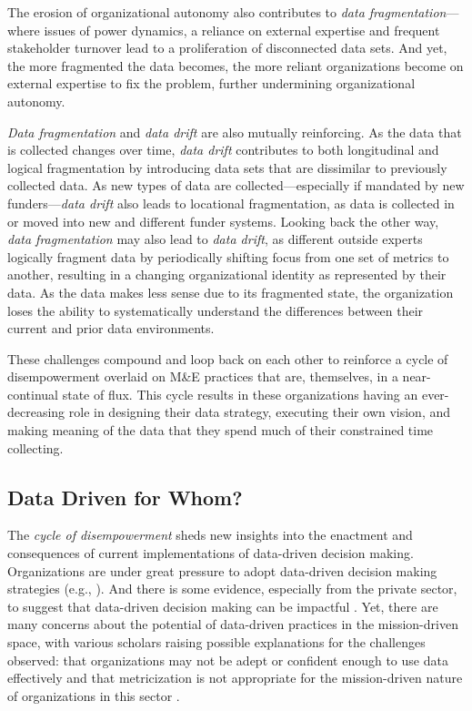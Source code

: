 The erosion of organizational autonomy also contributes to \textit{data fragmentation}---where issues of power dynamics, a reliance on external expertise and frequent stakeholder turnover lead to a proliferation of disconnected data sets. And yet, the more fragmented the data becomes, the more reliant organizations become on external expertise to fix the problem, further undermining organizational autonomy.

\textit{Data fragmentation} and \textit{data drift} are also mutually reinforcing. As the data that is collected changes over time, \textit{data drift} contributes to both longitudinal and logical fragmentation by introducing data sets that are dissimilar to previously collected data. As new types of data are collected---especially if mandated by new funders---\textit{data drift} also leads to locational fragmentation, as data is collected in or moved into new and different funder systems. Looking back the other way, \textit{data fragmentation} may also lead to \textit{data drift}, as different outside experts logically fragment data by periodically shifting focus from one set of metrics to another, resulting in a changing organizational identity as represented by their data. As the data makes less sense due to its fragmented state, the organization loses the ability to systematically understand the differences between their current and prior data environments.

These challenges compound and loop back on each other to reinforce a cycle of disempowerment overlaid on M\&E practices that are, themselves, in a near-continual state of flux. This cycle results in these organizations having an ever- decreasing role in designing their data strategy, executing their own vision, and making meaning of the data that they spend much of their constrained time collecting.

\subsection{Data Driven for Whom?}

The \textit{cycle of disempowerment} sheds new insights into the enactment and consequences of current implementations of data-driven decision making. Organizations are under great pressure to adopt data-driven decision making strategies (e.g., \cite{Haskins2011Building}). And there is some evidence, especially from the private sector, to suggest that data-driven decision making can be impactful \citep{Brynjolfsson2011Strength,Lavalle2011Big}. Yet, there are many concerns about the potential of data-driven practices in the mission-driven space, with various scholars raising possible explanations for the challenges observed: that organizations may not be adept or confident enough to use data effectively \citep{Maxwell2016Data} and that metricization is not appropriate for the mission-driven nature of organizations in this sector \citep{Benjamin2014Programs}.

